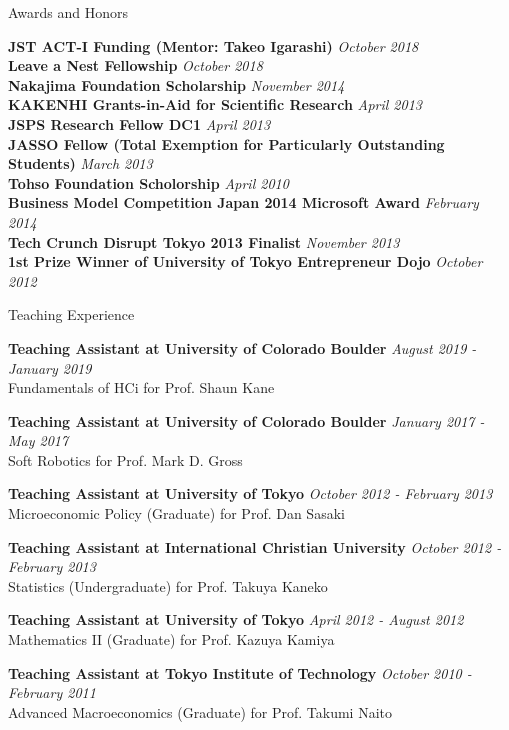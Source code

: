 \documentclass{resume} %
\begin{document}
\begin{rSection}{Awards and Honors}

{\bf JST ACT-I Funding (Mentor: Takeo Igarashi)} \hfill {\em October 2018} \\
{\bf Leave a Nest Fellowship} \hfill {\em October 2018} \\
{\bf Nakajima Foundation Scholarship} \hfill {\em November 2014} \\
{\bf KAKENHI Grants-in-Aid for Scientific Research} \hfill {\em April 2013} \\
{\bf JSPS Research Fellow DC1} \hfill {\em April 2013} \\
{\bf JASSO Fellow (Total Exemption for Particularly Outstanding Students) } \hfill {\em March 2013} \\
{\bf Tohso Foundation Scholorship} \hfill {\em April 2010} \\

{\bf Business Model Competition Japan 2014 Microsoft Award} \hfill {\em February 2014} \\
{\bf Tech Crunch Disrupt Tokyo 2013 Finalist} \hfill {\em November 2013} \\
{\bf 1st Prize Winner of University of Tokyo Entrepreneur Dojo} \hfill {\em October 2012} \\
\end{rSection}


\begin{rSection}{Teaching Experience}

{\bf Teaching Assistant at University of Colorado Boulder} \hfill {\em August 2019 - January 2019} \\
Fundamentals of HCi for Prof. Shaun Kane

{\bf Teaching Assistant at University of Colorado Boulder} \hfill {\em January 2017 - May 2017} \\
Soft Robotics for Prof. Mark D. Gross

{\bf Teaching Assistant at University of Tokyo} \hfill {\em October 2012 - February 2013} \\
Microeconomic Policy (Graduate) for Prof. Dan Sasaki

{\bf Teaching Assistant at International Christian University} \hfill {\em October 2012 - February 2013} \\
Statistics (Undergraduate) for Prof. Takuya Kaneko

{\bf Teaching Assistant at University of Tokyo} \hfill {\em April 2012 - August 2012} \\
Mathematics II (Graduate) for Prof. Kazuya Kamiya

{\bf Teaching Assistant at Tokyo Institute of Technology} \hfill {\em October 2010 - February 2011} \\
Advanced Macroeconomics (Graduate) for Prof. Takumi Naito

\end{rSection}
\end{document}
